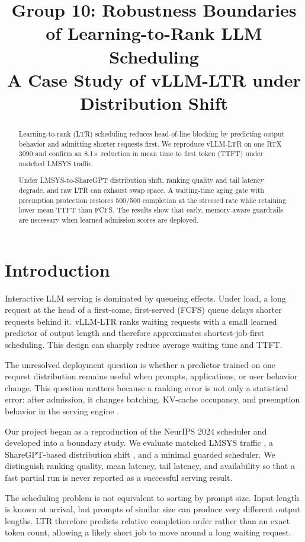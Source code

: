 \documentclass[conference]{IEEEtran}
\title{Group 10: Robustness Boundaries of Learning-to-Rank LLM Scheduling\\
{\large A Case Study of vLLM-LTR under Distribution Shift}}
\author{
\IEEEauthorblockN{Yuze Gao, Yuh Jen Sun, Shun Huang, Chenxi Li, and Mengze Hu}
\IEEEauthorblockA{FDU MSACS Capstone, CSCI 6806 / INFO 4205\\
July 2026}
}
\begin{document}
\maketitle

\begin{abstract}
Learning-to-rank (LTR) scheduling reduces head-of-line blocking by predicting output behavior and admitting shorter requests first. We reproduce vLLM-LTR on one RTX 3090 and confirm an 8.1$\times$ reduction in mean time to first token (TTFT) under matched LMSYS traffic.

Under LMSYS-to-ShareGPT distribution shift, ranking quality and tail latency degrade, and raw LTR can exhaust swap space. A waiting-time aging gate with preemption protection restores 500/500 completion at the stressed rate while retaining lower mean TTFT than FCFS. The results show that early, memory-aware guardrails are necessary when learned admission scores are deployed.
\end{abstract}

\section{Introduction}
Interactive LLM serving is dominated by queueing effects. Under load, a long request at the head of a first-come, first-served (FCFS) queue delays shorter requests behind it. vLLM-LTR \cite{fu2024ltr} ranks waiting requests with a small learned predictor of output length and therefore approximates shortest-job-first scheduling. This design can sharply reduce average waiting time and TTFT.

The unresolved deployment question is whether a predictor trained on one request distribution remains useful when prompts, applications, or user behavior change. This question matters because a ranking error is not only a statistical error: after admission, it changes batching, KV-cache occupancy, and preemption behavior in the serving engine \cite{kwon2023pagedattention}.

Our project began as a reproduction of the NeurIPS 2024 scheduler and developed into a boundary study. We evaluate matched LMSYS traffic \cite{zheng2024lmsys}, a ShareGPT-based distribution shift \cite{sharegpt2023}, and a minimal guarded scheduler. We distinguish ranking quality, mean latency, tail latency, and availability so that a fast partial run is never reported as a successful serving result.

The scheduling problem is not equivalent to sorting by prompt size. Input length is known at arrival, but prompts of similar size can produce very different output lengths. LTR therefore predicts relative completion order rather than an exact token count, allowing a likely short job to move around a long waiting request.
\end{document}
